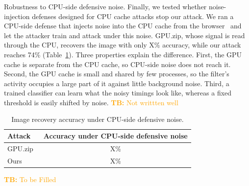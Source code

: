 \documentclass[letterpaper,twocolumn,10pt]{article}
\makeatletter
\newcommand{\colorcomment}[2]{\textcolor{#1}{#2}}
\newcommand{\taggedcolorcomment}[3]{\colorcomment{#1}{\textbf{#2} #3}}
\newcommand{\tapan}[1]{\taggedcolorcomment{orange}{TB:}{#1}}
\renewcommand\paragraph{\@startsection{paragraph}{4}{\z@}{4pt plus 1pt minus 1pt}{-0.6em}%
  {\normalfont\normalsize\bfseries}}
\makeatother
\begin{document}
\paragraph{Robustness to CPU-side defensive noise.} Finally, we tested whether noise-injection
defenses designed for CPU cache attacks stop our attack. We ran a CPU-side defense that injects
noise into the CPU cache from the browser~\cite{flipstress} and let the attacker train and attack under this noise. GPU.zip, whose signal is read through the CPU, recovers the image with only X\% accuracy, while our attack reaches 74\% (Table~\ref{tab:noise}). Three properties explain the difference. First, the GPU cache is separate from the CPU cache, so CPU-side noise does not reach it. Second, the GPU cache is small and shared by few processes, so the filter's activity occupies a large part of it against little background noise. Third, a trained classifier can learn what the noisy timings look like, whereas a fixed threshold is easily shifted by noise. \tapan{Not writtten well}

\begin{table}[h!]
\centering\small
\begin{tabular}{lc}
\toprule
Attack & Accuracy under CPU-side defensive noise \\
\midrule
GPU.zip~\cite{gpuzip} & X\% \\
Ours & X\% \\
\bottomrule
\end{tabular}
\caption{Image recovery accuracy under CPU-side defensive noise.} \tapan{To be Filled}
\label{tab:noise}
\end{table}

{\footnotesize


}
\end{document}
